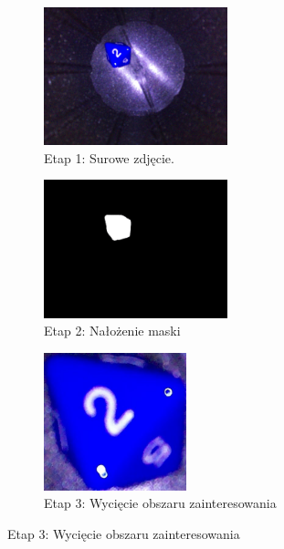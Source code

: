 \begin{figure}[H]
    \centering
    \begin{subfigure}[t]{0.32\linewidth}
        \centering
        \includegraphics[height=4cm]{chapters/04-czytanie/figures/2_1}
        \caption{Etap 1: Surowe zdjęcie.}
        \label{fig:step1}
    \end{subfigure}
    \hfill
    \begin{subfigure}[t]{0.32\linewidth}
        \centering
        \includegraphics[height=4cm]{chapters/04-czytanie/figures/2_2}
        \caption{Etap 2: Nałożenie maski}
        \label{fig:step2}
    \end{subfigure}
    \hfill
    \begin{subfigure}[t]{0.32\linewidth}
        \centering
        \includegraphics[height=4cm]{chapters/04-czytanie/figures/2_3}
        \caption{Etap 3: Wycięcie obszaru zainteresowania}
        \label{fig:step3}
    \end{subfigure}

    \vspace{0.5cm}


\end{figure}

